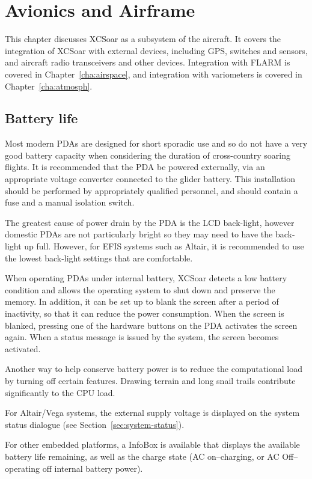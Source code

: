 \chapter{Avionics and Airframe}\label{cha:avionics-airframe}

This chapter discusses XCSoar as a subsystem of the aircraft.  It
covers the integration of XCSoar with external devices, including GPS,
switches and sensors, and aircraft radio transceivers and other
devices.  Integration with FLARM is covered in
Chapter~\ref{cha:airspace}, and integration with variometers is
covered in Chapter~\ref{cha:atmosph}.

\section{Battery life}

Most modern PDAs are designed for short sporadic use and so do not
have a very good battery capacity when considering the duration of
cross-country soaring flights.  It is recommended that the PDA be powered
externally, via an appropriate voltage converter connected to the glider battery.
This installation should be performed by appropriately qualified personnel,
and should contain a fuse and a manual isolation switch.

The greatest cause of power drain by the PDA is the LCD back-light,
however domestic PDAs are not particularly bright so they may need to
have the back-light up full. However, for EFIS systems such as Altair,
it is recommended to use the lowest back-light settings that are
comfortable.

When operating PDAs under internal battery, XCSoar detects a low
battery condition and allows the operating system to shut down and
preserve the memory.  In addition, it can be set up to blank the
screen after a period of inactivity, so that it can reduce the power
consumption.  When the screen is blanked, pressing one of the hardware
buttons on the PDA activates the screen again.  When a status message
is issued by the system, the screen becomes activated.

Another way to help conserve battery power is to reduce the
computational load by turning off certain features.  Drawing terrain
and long snail trails contribute significantly to the CPU load.

For Altair/Vega systems, the external supply voltage is displayed on
the system status dialogue (see Section~\ref{sec:system-status}).

For other embedded platforms, a  InfoBox is available that
displays the available battery life remaining, as well as the charge state
(AC on--charging, or AC Off--operating off internal battery power).

